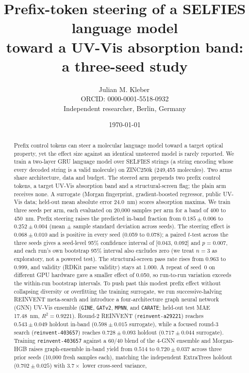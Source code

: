 \documentclass[11pt]{article}
\title{\textbf{Prefix-token steering of a SELFIES language model\\
toward a UV-Vis absorption band: a three-seed study}}
\author{Julian M. Kleber\,\orcidlink{0000-0001-5518-0932}\\
\small ORCID: 0000-0001-5518-0932\\
\small Independent researcher, Berlin, Germany}
\date{\today}
\begin{document}
\maketitle

\begin{abstract}
\noindent
Prefix control tokens can steer a molecular language model toward a target optical
property, yet the effect size against an identical unsteered model is rarely reported. We train a two-layer GRU
language model over SELFIES strings (a string encoding whose every decoded string is a
valid molecule) on ZINC250k (249{,}455 molecules). Two arms share architecture, data and
budget. The steered arm prepends two prefix control tokens, a target UV-Vis absorption
band and a structural-screen flag; the plain arm receives none. A surrogate
(Morgan fingerprint, gradient-boosted regressor, public UV-Vis data; held-out mean absolute
error 24.0~nm) scores absorption maxima. We train three seeds per arm,
each evaluated on 20{,}000 samples per arm for a band of 400 to 450~nm. Prefix steering raises the
predicted in-band fraction from $0.185 \pm 0.006$ to $0.252 \pm 0.004$ (mean $\pm$ sample
standard deviation across seeds). The steering effect is
$0.068 \pm 0.010$ and is positive in every seed (0.059 to 0.078); a paired $t$-test across
the three seeds gives a seed-level 95\% confidence interval of [0.043, 0.092] and $p=0.007$,
and each run's own bootstrap 95\% interval also excludes zero (we treat $n=3$ as exploratory,
not a powered test). The structural-screen pass rate rises from 0.963 to 0.999,
and validity (RDKit parse validity) stays at 1.000. A repeat of seed~0 on different GPU
hardware gave a smaller effect of 0.050, so run-to-run variation exceeds the within-run
bootstrap intervals. To push past this modest prefix effect without collapsing diversity or overfitting the
training surrogate, we run successive-halving REINVENT meta-search and introduce a
four-architecture graph neural network (GNN) UV-Vis ensemble (\texttt{GINE}, \texttt{GATv2},
\texttt{MPNN}, and \texttt{CARATE}; held-out test MAE 17.48~nm, $R^2=0.9221$). Round-2
REINVENT (\texttt{reinvent-a29221}) reaches $0.543 \pm 0.049$ holdout in-band ($0.598 \pm 0.015$
surrogate), while a focused round-3 search (\texttt{reinvent-403657}) reaches $0.728 \pm 0.093$
holdout ($0.717 \pm 0.044$ surrogate). Training \texttt{reinvent-403657} against a 60/40 blend
of the 4-GNN ensemble and Morgan-HGB raises graph-ensemble in-band yield from $0.514$ to
$0.720 \pm 0.037$ across three prior seeds (10{,}000 fresh samples each), matching the
independent ExtraTrees holdout ($0.702 \pm 0.025$) with $3.7\times$ lower cross-seed variance,

\end{abstract}
\end{document}
